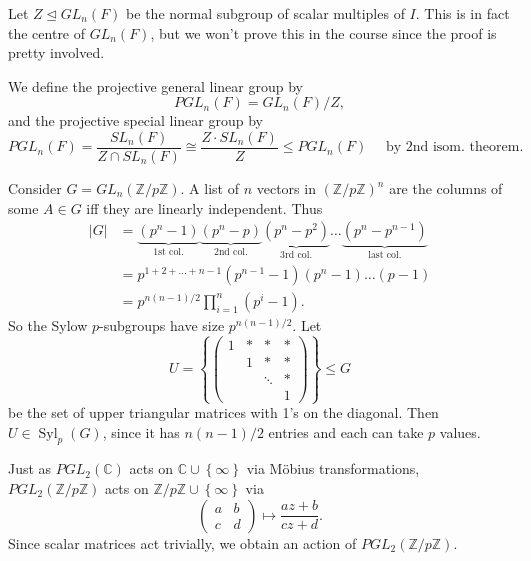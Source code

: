 \documentclass[egregdoesnotlikesansseriftitles,a4paper]{scrartcl}
\begin{document}
Let $Z \unlhd GL_{n}(F)$ be the normal subgroup of scalar multiples of $I$. This is in fact the centre of $GL_{n}(F)$, but we won't prove this in the course since the proof is pretty involved.
\begin{definition*}
      We define the projective general linear group by \[
      PGL_{n}(F)=GL_{n}(F)/Z
      ,\] and the projective special linear group by \[
          PGL_{n}(F)= \frac{SL_{n}(F)}{Z \cap SL_{n}(F)} \cong \frac{Z \cdot  SL_{n}(F)}{Z} \leq PGL_{n}(F) \quad \text{ by 2nd isom. theorem}
      .\] 
\end{definition*}
\begin{example*}
     Consider $G=GL_{n}(\mathbb{Z}/p\mathbb{Z})$. A list of $n$ vectors in $(\mathbb{Z}/p\mathbb{Z})^{n}$ are the columns of some $A \in G$ iff they are linearly independent. Thus 
     \begin{align*}
          |G|&= \underbrace{(p^{n}-1)}_{\text{1st col.} }\underbrace{(p^{n}-p)}_{\text{2nd col.} } \underbrace{(p^{n}-p^2)}_{\text{3rd col.} } \ldots \underbrace{(p^{n}-p^{n-1})}_{\text{last col.} } \\
          &=p^{1+2+\ldots +n-1} (p^{n-1}-1)(p^{n}-1)\ldots (p-1)\\
          &=p^{n (n-1)/2} \prod_{i=1}^n (p^{i}-1).
     \end{align*}
     So the Sylow $p$-subgroups have size $p^{n (n-1)/2}$. Let \[
     U=\left\{\begin{pmatrix} 1&\ast&\ast&\ast\\ &1&\ast& \ast\\ &&\ddots &\ast \\ &&&1 \end{pmatrix}\right\} \leq G
     \] be the set of upper triangular matrices with 1's on the diagonal. Then $U \in \operatorname{Syl}_{p}(G)$, since it has $n (n-1)/2$ entries and each can take $p$ values.
\end{example*}
Just as $PGL_{2}(\mathbb{C})$ acts on $\mathbb{C} \cup \left\{ \infty\right\}$ via Möbius transformations, $PGL_{2}(\mathbb{Z}/p\mathbb{Z})$ acts on $\mathbb{Z}/p\mathbb{Z} \cup \left\{ \infty\right\}$ via \[
\begin{pmatrix} a&b\\c&d  \end{pmatrix}\mapsto  \frac{az+b}{cz+d}
.\] Since scalar matrices act trivially, we obtain an action of $PGL_{2}(\mathbb{Z}/p\mathbb{Z})$.
\end{document}

